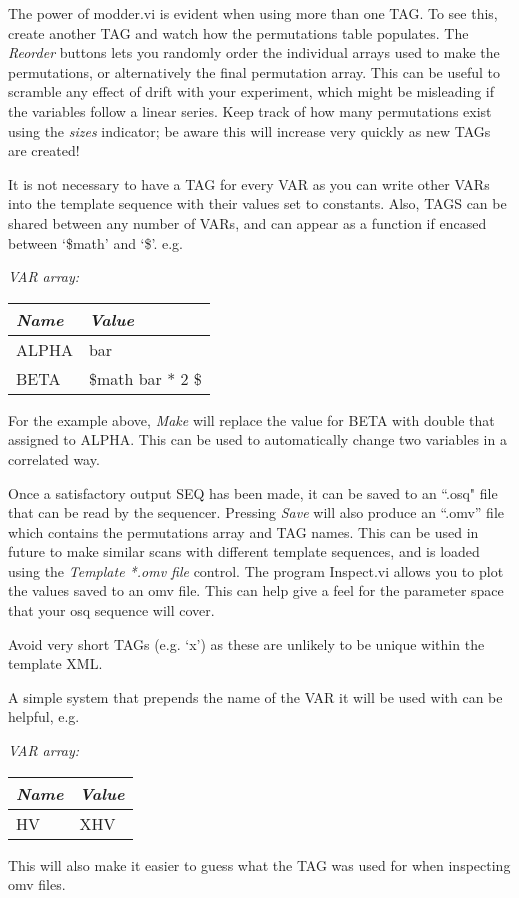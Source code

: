 \documentclass[10pt,a4paper]{article}
\newenvironment{warning}[1]{%
	\tcolorbox[beamer,%
	breakable,
	colback=white,colframe=DarkRed,%
	title=Warning:]}%
{\endtcolorbox}
\begin{document}
The power of modder.vi is evident when using more than one TAG.  To see this, create another TAG and watch how the permutations table populates.  The \emph{Reorder} buttons lets you randomly order the individual arrays used to make the permutations, or alternatively the final permutation array.  This can be useful to scramble any effect of drift with your experiment, which might be misleading if the variables follow a linear series.  Keep track of how many permutations exist using the \emph{sizes} indicator; be aware this will increase very quickly as new TAGs are created!

It is not necessary to have a TAG for every VAR as you can write other VARs into the template sequence with their values set to constants.  Also, TAGS can be shared between any number of VARs, and can appear as a function if encased between `\$math' and `\$'. e.g.

\hangindent=0.7cm
\emph{VAR array:} \\
\begin{tabularx}{0.5\textwidth}{X|X}
	\emph{Name} & \emph{Value} \\
	\hline	
	ALPHA & bar \\
	BETA & \$math bar * 2 \$
\end{tabularx}
\vspace{2mm}

\noindent For the example above, \emph{Make} will replace the value for BETA with double that assigned to ALPHA.  This can be used to automatically change two variables in a correlated way.

Once a satisfactory output SEQ has been made, it can be saved to an ``.osq" file that can be read by the sequencer.  Pressing \emph{Save} will also produce an ``.omv'' file which contains the permutations array and TAG names.  This can be used in future to make similar scans with different template sequences, and is loaded using the \emph{Template *.omv file} control.  The program Inspect.vi allows you to plot the values saved to an omv file. This can help give a feel for the parameter space that your osq sequence will cover.

\begin{warning} {}
	Avoid very short TAGs  (e.g. `x') as these are unlikely to be unique within the template XML.
	
	A simple system that prepends the name of the VAR it will be used with can be helpful, e.g.

	\hangindent=0.7cm
	\emph{VAR array:} \\
	\begin{tabularx}{0.5\textwidth}{X|X}
		\emph{Name} & \emph{Value} \\
		\hline
		HV & XHV \\
	\end{tabularx}
	\vspace{2mm}
	
	This will also make it easier to guess what the TAG was used for when inspecting omv files.
\end{warning}
\end{document}
